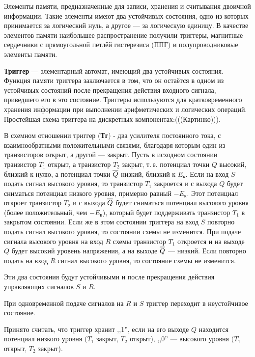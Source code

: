 \documentclass[10pt,a4paper,titlepage]{article}
\begin{document}
Элементы памяти, предназначенные для записи, хранения и считывания двоичной информации.
Такие элементы имеют два устойчивых состояния, одно из которых принимается за логический нуль, а другое --- за логическую единицу.
В качестве элементов памяти наибольшее распространение получили триггеры, магнитные сердечники с прямоугольной петлёй гистерезиса (ППГ) и полупроводниковые элементы памяти.

\textbf{Триггер} --- элементарный автомат, имеющий два устойчивых состояния.
Функция памяти триггера заключается в том, что он остаётся в одном из устойчивых состояний после прекращения действия входного сигнала, приведшего его в это состояние.
Триггеры используются для кратковременного хранения информации при выполнении арифметических и логических операций.
Простейшая схема триггера на дискретных компонентах:(((Картинко))).

В схемном отношении триггер (\textbf{Тг}) - два усилителя постоянного тока, с взаимнообратными положительными связями, благодаря которым один из транзисторов открыт, а другой --- закрыт.
Пусть в исходном состоянии транзистор $T_1$ открыт, а транзистор $T_2$ закрыт, т.\,е. потенциал точки $Q$ высокий, близкий к нулю, а потенциал точки $\overline{\mathstrut Q}$ низкий, близкий к $E_{к}$.
Если на вход $S$ подать сигнал высокого уровня, то транзистор $T_1$ закроется и с выхода $Q$ будет сниматься потенциал низкого уровня, примерно равный $-E_{к}$.
Этот потенциал откроет транзистор $T_2$ и с выхода $\overline{\mathstrut Q}$ будет сниматься потенциал высокого уровня (более положительный, чем $-E_{к}$), который будет поддерживать транзистор $T_1$ в закрытом состоянии.
Если же в этом состоянии триггера на вход $S$ повторно подать сигнал высокого уровня, то состоянии схемы не изменится.
При подаче сигнала высокого уровня на вход $R$ схемы транзистор $T_1$ откроется и на выходе $Q$ будет высокий уровень напряжения, а на выходе $\overline{\mathstrut Q}$ --- низкий.
Если повторно подать на вход $R$ сигнал высокого уровня, то состояние схемы не изменится.

Эти два состояния будут устойчивыми и после прекращения действия управляющих сигналов $S$ и $R$.

При одновременной подаче сигналов на $R$ и $S$ триггер переходит в неустойчивое состояние.

Принято считать, что триггер хранит ,,1'', если на его выходе $Q$ находится потенциал низкого уровня ($T_1$ закрыт, $T_2$ открыт), ,,0'' --- высокого уровня ($T_1$ открыт, $T_2$ закрыт).
\end{document}
